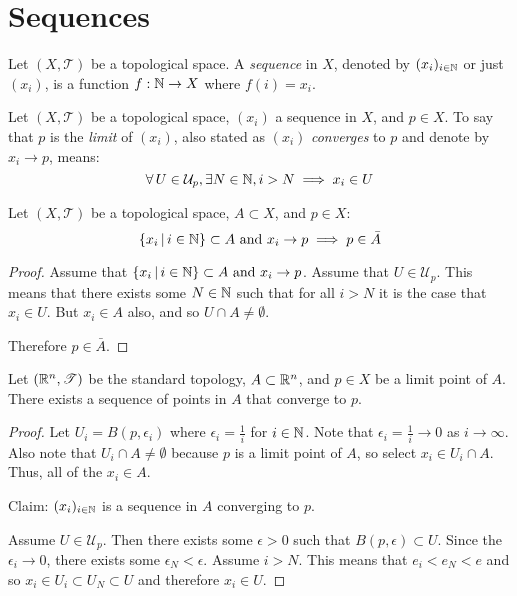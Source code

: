 \documentclass[letterpaper,12pt,fleqn]{article}
\newcommand{\T}{\mathscr{T}}
\newcommand{\U}{\mathcal{U}}
\newcommand{\e}{\epsilon}
\begin{document}
\section*{Sequences}

\begin{definition}[Sequence]
  Let \((X,\T)\) be a topological space.  A \emph{sequence} in \(X\), denoted by \((x_i)_{i\in\mathbb{N}}\) or just
  \((x_i)\), is a function \(f:\mathbb{N}\to X\) where \(f(i)=x_i\).
\end{definition}

\begin{definition}[Limit]
  Let \((X,\T)\) be a topological space, \((x_i)\) a sequence in \(X\), and \(p\in X\).  To say that \(p\) is the
  \emph{limit} of \((x_i)\), also stated as \((x_i)\) \emph{converges} to \(p\) and denote by \(x_i\to p\), means:
  \[\forall\,U\in\U_p,\exists N\in\N,i>N\implies x_i\in U\]
\end{definition}

\begin{theorem}
  Let \((X,\T)\) be a topological space, \(A\subset X\), and \(p\in X\):
  \[\setb{x_i}{i\in\N}\subset A\ \text{and}\ x_i\to p\implies p\in\bar{A}\]
\end{theorem}

\begin{proof}
  Assume that \(\left\{{x_i}\,\middle|\,{i\in\mathbb{N}}\right\}\subset A\ \text{and}\ x_i\to p\).  Assume that \(U\in\U_p\).  This means that
  there exists some \(N\in\mathbb{N}\) such that for all \(i>N\) it is the case that \(x_i\in U\).  But \(x_i\in A\) also,
  and so \(U\cap A\ne\emptyset\).

  Therefore \(p\in\bar{A}\).
\end{proof}

\begin{theorem}
  Let \((\R^n,\T)\) be the standard topology, \(A\subset\mathbb{R}^n\), and \(p\in X\) be a limit point of \(A\).  There
  exists a sequence of points in \(A\) that converge to \(p\).
\end{theorem}

\begin{proof}
  Let \(U_i=B\left(p,\e_i\right)\) where \(\e_i=\frac{1}{i}\) for \(i\in\mathbb{N}\).  Note that \(\e_i=\frac{1}{i}\to0\)
  as \(i\to\infty\).  Also note that \(U_i\cap A\ne\emptyset\) because \(p\) is a limit point of \(A\), so select
  \(x_i\in U_i\cap A\).  Thus, all of the \(x_i\in A\).

  Claim: \((x_i)_{i\in\mathbb{N}}\) is a sequence in \(A\) converging to \(p\).

  Assume \(U\in\U_p\).  Then there exists some \(\e>0\) such that \(B(p,\e)\subset U\).  Since the \(\e_i\to0\),
  there exists some \(\e_N<\e\).  Assume \(i>N\).  This means that \(e_i<e_N<e\) and so
  \(x_i\in U_i\subset U_N\subset U\) and therefore \(x_i\in U\).
\end{proof}
\end{document}
